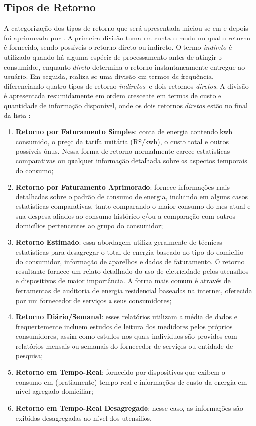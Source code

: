 \subsection{Tipos de Retorno}
\label{ssec:ret_tipos}

A categorização dos tipos de retorno que será apresentada iniciou-se em
\cite{2000_darby} e depois foi aprimorada por \cite{2009_epri}. A primeira divisão
toma em conta o modo no qual o retorno é fornecido, sendo possíveis o retorno 
direto ou indireto. O termo \emph{indireto} é
utilizado quando há alguma espécie de processamento antes de atingir o
consumidor, enquanto \emph{direto} determina o retorno instantaneamente entregue
ao usuário. Em seguida, realiza-se uma divisão em termos de frequência,
diferenciando quatro tipos de retorno \emph{indiretos}, e dois retornos
\emph{diretos}. A divisão é apresentada resumidamente em ordem crescente em 
termos de custo e 
quantidade de informação disponível, onde os dois retornos \emph{diretos} estão no
final da lista \cite{aceee_2010_estudos_feedback,2009_epri}:

\begin{enumerate}
\item \textbf{Retorno por Faturamento Simples}: conta de energia contendo 
k\acrshort{wh} 
consumido, o preço da tarifa unitária ($\text{R\$}/$k\acrshort{wh}), o custo 
total e outros possíveis ônus. Nessa forma de retorno normalmente carece 
estatísticas comparativas ou qualquer informação detalhada sobre os aspectos 
temporais do consumo;
\item \textbf{Retorno por Faturamento Aprimorado}: fornece informações mais 
detalhadas
sobre o padrão de consumo de energia, incluindo em alguns casos estatísticas
comparativas, tanto comparando o maior consumo do mes atual e sua despesa
aliados ao consumo histórico e/ou a comparação com outros domicílios
pertencentes ao grupo do consumidor;
\item \textbf{Retorno Estimado}: essa abordagem utiliza geralmente de técnicas
estatísticas para desagregar o total de energia baseado no tipo do
domicílio do consumidor, informação de aparelhos e dados de faturamento. O
retorno resultante fornece um relato detalhado do uso de eletricidade pelos
utensilios e dispositivos de maior importância. A forma mais comum é através de
ferramentas de auditoria de energia residencial baseadas na internet, oferecida
por um fornecedor de serviços a seus consumidores;
\item \textbf{Retorno Diário/Semanal}: esses relatórios utilizam a média de
dados e frequentemente incluem estudos de leitura dos medidores pelos próprios 
consumidores, assim como estudos nos quais individuos são providos com
relatórios mensais ou semanais do fornecedor de serviços ou entidade de
pesquisa;
\item \textbf{Retorno em Tempo-Real}: fornecido por dispositivos que exibem o
consumo em (pratiamente) tempo-real e informações de custo da energia em nível
agregado domiciliar;
\item \textbf{Retorno em Tempo-Real Desagregado}: nesse caso, as informações são
exibidas desagregadas ao nível dos utensílios.
\end{enumerate}

